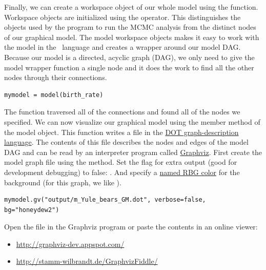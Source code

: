 Finally, we can create a workspace object of our whole model using the  function. 
Workspace objects are initialized using the \cl{=} operator. This distinguishes the objects used by the program
to run the MCMC analysis from the distinct nodes of our graphical model.
The model workspace objects makes it easy to work with the model in the \Rev~language and creates a wrapper around our model DAG. 
Because our model is a directed, acyclic graph (DAG), we only need to give the model wrapper function a single node and it does the work to find all the other nodes through their connections.
{\tt \begin{snugshade*}
\begin{lstlisting}
mymodel = model(birth_rate)
\end{lstlisting}
\end{snugshade*}}

The  function traversed all of the connections and found all of the nodes we specified. 
We can now visualize our graphical model using the  member method of the model object. 
This function writes a file in the \href{http://en.wikipedia.org/wiki/DOT_(graph_description_language)}{DOT graph-description language}.
The contents of this file describes the nodes and edges of the model DAG and can be read by an interpreter program called \href{http://www.graphviz.org/}{Graphviz}.
First create the model graph file using the  method. Set the flag for extra output (good for development debugging) to false: .
And specify a \href{http://web.njit.edu/~kevin/rgb.txt.html}{named RBG color} for the background (for this graph, we like ). 
{\tt \begin{snugshade*}
\begin{lstlisting}
mymodel.gv("output/m_Yule_bears_GM.dot", verbose=false, bg="honeydew2")
\end{lstlisting}
\end{snugshade*}}

Open the  file in the Graphviz program or paste the contents in an online viewer:
\begin{itemize}[noitemsep,nolistsep]
  \item \href{http://graphviz-dev.appspot.com/}{http://graphviz-dev.appspot.com/}
  \item \href{http://stamm-wilbrandt.de/GraphvizFiddle/}{http://stamm-wilbrandt.de/GraphvizFiddle/}
\end{itemize}

